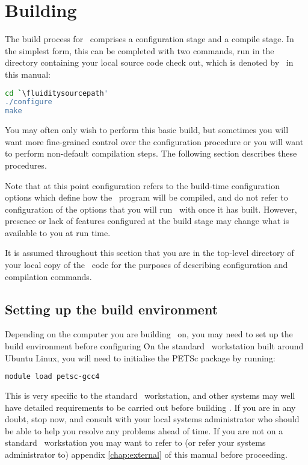 \section{Building \fluidity}
\label{sec:building_fluidity}

The build process for \fluidity\ comprises a configuration stage and a compile
stage. In the simplest form, this can be completed with two commands, run in
the directory containing your local source code check out, which is denoted
by \fluiditysourcepath\ in this manual:

\begin{lstlisting}[language=Bash]
cd `\fluiditysourcepath' 
./configure
make
\end{lstlisting}

You may often only wish to perform this basic build, but sometimes you will
want more fine-grained control over the configuration procedure or you will
want to perform non-default compilation steps. The following section describes
these procedures.

Note that at this point configuration refers to the build-time configuration
options which define how the \fluidity\ program will be compiled, and do not
refer to configuration of the options that you will run \fluidity\ with once it 
has built. However, presence or lack of features configured at the build stage
may change what is available to you at run time.

It is assumed throughout this section that you are in the top-level directory
of your local copy of the \fluidity\ code for the purposes of describing
configuration and compilation commands.

\subsection{Setting up the build environment}

Depending on the computer you are building \fluidity\ on, you may need to set
up the build environment before configuring \fluidity\. On the standard
\fluidity\ workstation built around Ubuntu Linux, you will need to initialise
the PETSc package by running:

\begin{lstlisting}[language=Bash]
module load petsc-gcc4
\end{lstlisting}

This is very specific to the standard \fluidity\ workstation, and other systems
may well have detailed requirements to be carried out before building
\fluidity. If you are in any doubt, stop now, and consult with your local
systems administrator who should be able to help you resolve any problems ahead
of time. If you are not on a standard \fluidity\ workstation you may want to
refer to (or refer your systems administrator to) appendix \ref{chap:external}
of this manual before proceeding.

